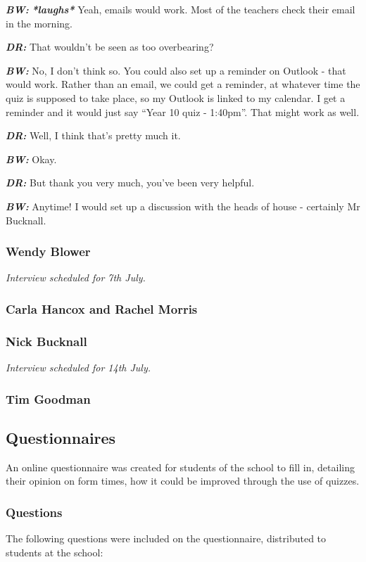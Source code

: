 \textit{\textbf{BW:}} \textit{\textbf{*laughs*}} Yeah, emails would work. Most of the teachers check their email in the morning.

\textit{\textbf{DR:}} That wouldn't be seen as too overbearing?

\textit{\textbf{BW:}} No, I don't think so. You could also set up a reminder on Outlook - that would work. Rather than an email, we could get a reminder, at whatever time the quiz is supposed to take place, so my Outlook is linked to my calendar. I get a reminder and it would just say ``Year 10 quiz - 1:40pm''. That might work as well.

\textit{\textbf{DR:}} Well, I think that's pretty much it.

\textit{\textbf{BW:}} Okay.

\textit{\textbf{DR:}} But thank you very much, you've been very helpful.

\textit{\textbf{BW:}} Anytime! I would set up a discussion with the heads of house - certainly Mr Bucknall.

\subsubsection{Wendy Blower}

\textit{Interview scheduled for 7th July.}

\subsubsection{Carla Hancox and Rachel Morris}

\subsubsection{Nick Bucknall}

\textit{Interview scheduled for 14th July.}

\subsubsection{Tim Goodman}

\subsection{Questionnaires}
An online questionnaire was created for students of the school to fill in, detailing their opinion on form times, how it could be improved through the use of quizzes.

\subsubsection{Questions}
The following questions were included	 on the questionnaire, distributed to students at the school:

